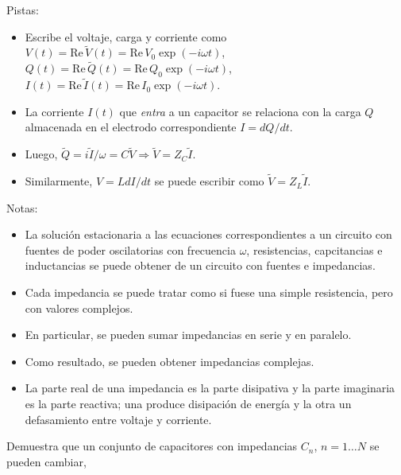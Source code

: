 \documentclass{exam}
\begin{document}
\begin{questions}

  Pistas:
  \begin{itemize}
  \item Escribe el voltaje, carga y corriente como
    $V(t)=\mathrm{Re}\,\tilde V(t)=\mathrm{Re}\,
    V_0 \exp(-i\omega t)$, $Q(t)=\mathrm{Re}\,\tilde Q(t)=\mathrm{Re}\,
    Q_0 \exp(-i\omega t)$, $I(t)=\mathrm{Re}\,\tilde I(t)=\mathrm{Re}\,I_0 \exp(-i\omega t)$.
  \item La corriente $I(t)$ que {\em entra} a un capacitor se
    relaciona con
    la carga $Q$ almacenada en el electrodo correspondiente
    $I=dQ/dt$.
  \item Luego, $\tilde Q=i\tilde I/\omega=C \tilde V\Rightarrow \tilde
    V=Z_C\tilde I$.
  \item Similarmente, $V=Ld I/d t$ se puede escribir como $\tilde
    V=Z_L\tilde I$.
  \end{itemize}
  Notas:
  \begin{itemize}
  \item La solución estacionaria a las ecuaciones correspondientes a
    un circuito con fuentes de poder oscilatorias con frecuencia
    $\omega$, resistencias, capcitancias e inductancias se
    puede obtener de un circuito con fuentes e impedancias.
  \item Cada impedancia se puede tratar como si fuese una simple
    resistencia, pero con valores complejos.
  \item En particular, se pueden sumar impedancias en serie y en
    paralelo.
  \item Como resultado, se pueden obtener impedancias complejas.
  \item La parte real de una impedancia es la parte disipativa y la
    parte imaginaria es la parte reactiva; una produce disipación de
    energía y la otra un defasamiento entre voltaje y corriente.
  \end{itemize}

  \question Demuestra que un conjunto de capacitores con impedancias
  $C_n$, $n=1\ldots N$ se pueden cambiar,
\end{questions}
\end{document}
